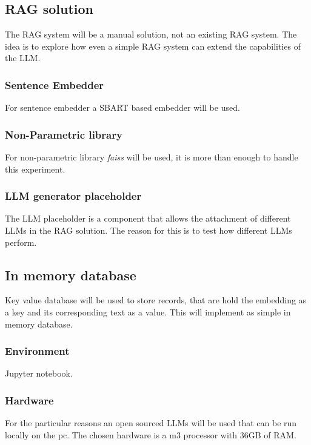 \documentclass{wseas}
\begin{document}
\newpage

\subsection{RAG solution}

The RAG system will be a manual solution, not an existing RAG system.
The idea is to explore how even a simple RAG system can extend the
capabilities of the LLM.

\subsubsection{Sentence Embedder}

For sentence embedder a SBART based embedder will be used.

\subsubsection{Non-Parametric library}

For non-parametric library \textit{faiss} will be used, it is more than
enough to handle this experiment.

\subsubsection{LLM generator placeholder}

The LLM placeholder is a component that allows the attachment of 
different LLMs in the RAG solution. The reason for this is to test 
how different LLMs perform.

\subsection{In memory database}
Key value database will be used to store records, that are hold the embedding as a key
and its corresponding text as a value. This will implement as simple in memory database.
\subsubsection{Environment}

Jupyter notebook.

\subsubsection{Hardware}

For the particular reasons an open sourced LLMs will be used that can be
run locally on the pc. The chosen hardware is a m3 processor with 36GB
of RAM.
\end{document}
